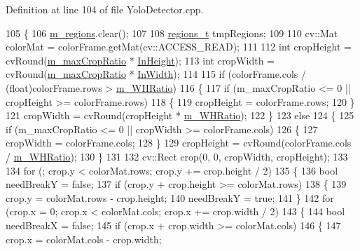 Definition at line 104 of file Yolo\+Detector.\+cpp.


\begin{DoxyCode}
105 \{
106     \mbox{\hyperlink{class_base_detector_a409c20093acba261db8354ca72058fce}{m\_regions}}.clear();
107 
108     \mbox{\hyperlink{defines_8h_a01db0de56a20f4342820a093c5154536}{regions\_t}} tmpRegions;
109 
110     cv::Mat colorMat = colorFrame.getMat(cv::ACCESS\_READ);
111 
112     \textcolor{keywordtype}{int} cropHeight = cvRound(\mbox{\hyperlink{class_yolo_detector_a86e05dcc3f10e2b0a1522f7513ff89e5}{m\_maxCropRatio}} * \mbox{\hyperlink{class_yolo_detector_a8511b801a9410af0b2715d4236a4b127}{InHeight}});
113     \textcolor{keywordtype}{int} cropWidth = cvRound(\mbox{\hyperlink{class_yolo_detector_a86e05dcc3f10e2b0a1522f7513ff89e5}{m\_maxCropRatio}} * \mbox{\hyperlink{class_yolo_detector_a01461f7ada4da3e8027d805f7129bab4}{InWidth}});
114 
115     \textcolor{keywordflow}{if} (colorFrame.cols / (\textcolor{keywordtype}{float})colorFrame.rows > \mbox{\hyperlink{class_yolo_detector_ab6b6271101b6d3a78af10c8802ac88af}{m\_WHRatio}})
116     \{
117         \textcolor{keywordflow}{if} (m\_maxCropRatio <= 0 || cropHeight >= colorFrame.rows)
118         \{
119             cropHeight = colorFrame.rows;
120         \}
121         cropWidth = cvRound(cropHeight * \mbox{\hyperlink{class_yolo_detector_ab6b6271101b6d3a78af10c8802ac88af}{m\_WHRatio}});
122     \}
123     \textcolor{keywordflow}{else}
124     \{
125         \textcolor{keywordflow}{if} (m\_maxCropRatio <= 0 || cropWidth >= colorFrame.cols)
126         \{
127             cropWidth = colorFrame.cols;
128         \}
129         cropHeight = cvRound(colorFrame.cols / \mbox{\hyperlink{class_yolo_detector_ab6b6271101b6d3a78af10c8802ac88af}{m\_WHRatio}});
130     \}
131 
132     cv::Rect crop(0, 0, cropWidth, cropHeight);
133 
134     \textcolor{keywordflow}{for} (; crop.y < colorMat.rows; crop.y += crop.height / 2)
135     \{
136         \textcolor{keywordtype}{bool} needBreakY = \textcolor{keyword}{false};
137         \textcolor{keywordflow}{if} (crop.y + crop.height >= colorMat.rows)
138         \{
139             crop.y = colorMat.rows - crop.height;
140             needBreakY = \textcolor{keyword}{true};
141         \}
142         \textcolor{keywordflow}{for} (crop.x = 0; crop.x < colorMat.cols; crop.x += crop.width / 2)
143         \{
144             \textcolor{keywordtype}{bool} needBreakX = \textcolor{keyword}{false};
145             \textcolor{keywordflow}{if} (crop.x + crop.width >= colorMat.cols)
146             \{
147                 crop.x = colorMat.cols - crop.width;

\end{DoxyCode}
